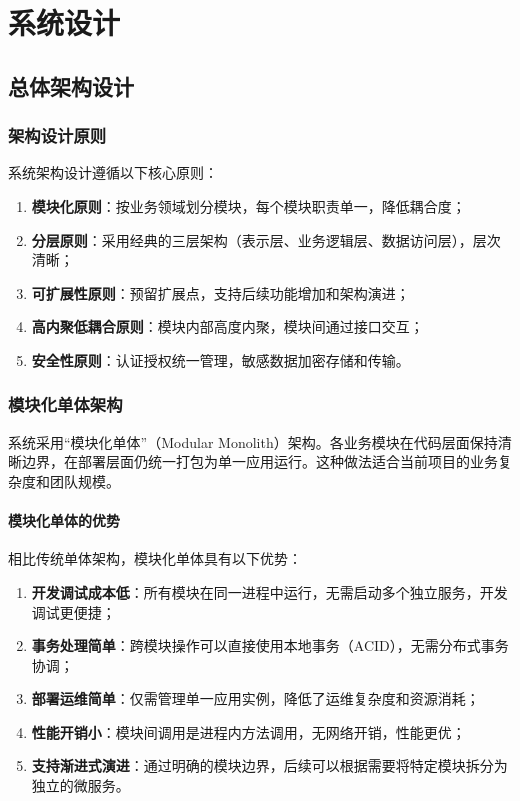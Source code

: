 ﻿%
\chapter{系统设计}

\section{总体架构设计}

\subsection{架构设计原则}

系统架构设计遵循以下核心原则：

\begin{enumerate}
  \item \textbf{模块化原则}：按业务领域划分模块，每个模块职责单一，降低耦合度；
  \item \textbf{分层原则}：采用经典的三层架构（表示层、业务逻辑层、数据访问层），层次清晰；
  \item \textbf{可扩展性原则}：预留扩展点，支持后续功能增加和架构演进；
  \item \textbf{高内聚低耦合原则}：模块内部高度内聚，模块间通过接口交互；
  \item \textbf{安全性原则}：认证授权统一管理，敏感数据加密存储和传输。
\end{enumerate}

\subsection{模块化单体架构}

系统采用“模块化单体”（Modular Monolith）架构。各业务模块在代码层面保持清晰边界，在部署层面仍统一打包为单一应用运行。这种做法适合当前项目的业务复杂度和团队规模。

\subsubsection{模块化单体的优势}

相比传统单体架构，模块化单体具有以下优势：

\begin{enumerate}
  \item \textbf{开发调试成本低}：所有模块在同一进程中运行，无需启动多个独立服务，开发调试更便捷；
  \item \textbf{事务处理简单}：跨模块操作可以直接使用本地事务（ACID），无需分布式事务协调；
  \item \textbf{部署运维简单}：仅需管理单一应用实例，降低了运维复杂度和资源消耗；
  \item \textbf{性能开销小}：模块间调用是进程内方法调用，无网络开销，性能更优；
  \item \textbf{支持渐进式演进}：通过明确的模块边界，后续可以根据需要将特定模块拆分为独立的微服务。
\end{enumerate}

